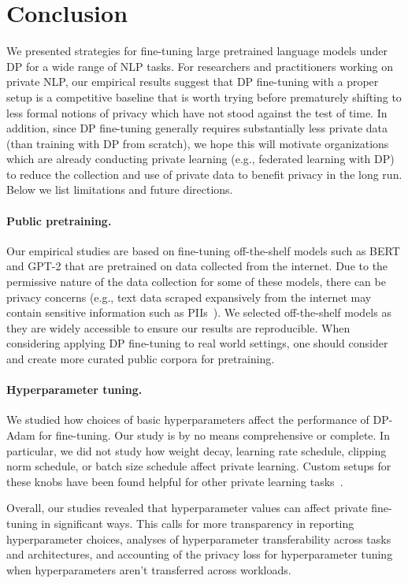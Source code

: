 
\section{Conclusion}

We presented strategies for fine-tuning large pretrained language models under DP for a wide range of NLP tasks. 
For researchers and practitioners working on private NLP, our empirical results suggest that DP fine-tuning with a proper setup is a competitive baseline that is worth trying before prematurely shifting to less formal notions of privacy which have not stood against the test of time.
In addition, since DP fine-tuning generally requires substantially less private data (than training with DP from scratch), we hope this will motivate organizations which are already conducting private learning (e.g., federated learning with DP) to reduce the collection and use of private data to benefit privacy in the long run.
Below we list limitations and future directions. 

\paragraph{Public pretraining.}
Our empirical studies are based on fine-tuning off-the-shelf models such as BERT and GPT-2 that are pretrained on data collected from the internet. 
Due to the permissive nature of the data collection for some of these models, there can be privacy concerns (e.g., text data scraped expansively from the internet may contain sensitive information such as PIIs~\citep{carlini2020extracting}).
We selected off-the-shelf models as they are widely accessible to ensure our results are reproducible.
When considering applying DP fine-tuning to real world settings, one should consider and create more curated public corpora for pretraining.

\paragraph{Hyperparameter tuning.}
We studied how choices of basic hyperparameters affect the performance of DP-Adam for fine-tuning.
Our study is by no means comprehensive or complete.
In particular, we did not study how weight decay, learning rate schedule, clipping norm schedule, or batch size schedule affect private learning. 
Custom setups for these knobs have been found helpful for other private learning tasks~\citep{anil2021large}. 

Overall, our studies revealed that hyperparameter values can affect private fine-tuning in significant ways.
This calls for more transparency in reporting hyperparameter choices, analyses of hyperparameter transferability across tasks and architectures, and accounting of the privacy loss for hyperparameter tuning when hyperparameters aren't transferred across workloads.

